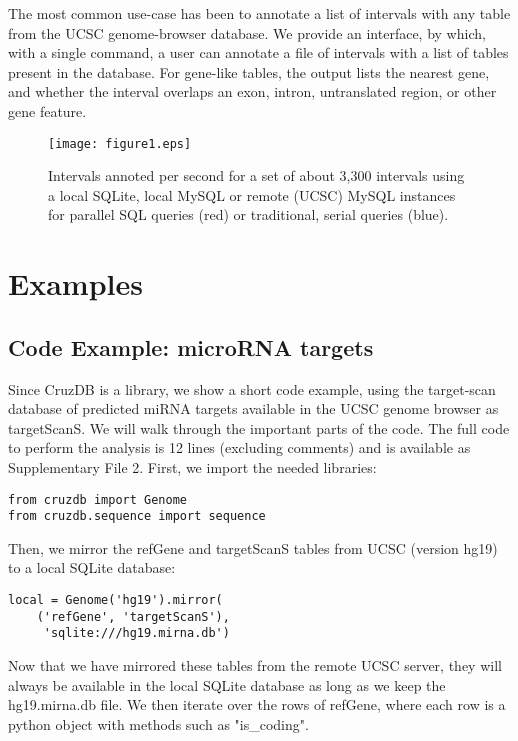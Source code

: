 \documentclass{bioinfo}
\begin{document}
\begin{methods}
The most common use-case has been to annotate a list of intervals with any table from the UCSC genome-browser database. We provide an interface, by which, with a single command, a user can annotate a file of intervals with a list of tables present in the database. For gene-like tables, the output lists the nearest gene, and whether the interval overlaps an exon, intron, untranslated region, or other gene feature.
\end{methods}

\begin{figure}[!tpb]%
\centerline{\texttt{[image: figure1.eps]}}
\caption{Intervals annoted per second for a set of about 3,300 intervals using a local SQLite,
local MySQL or remote (UCSC) MySQL instances for parallel SQL queries (red) or traditional, 
serial queries (blue).
}\label{fig:01}
\end{figure}

\section{Examples}


\subsection{Code Example: microRNA targets}

Since CruzDB is a library, we show a short code example, using the target-scan database of predicted miRNA targets \citep{Grimson} available in the UCSC genome browser as targetScanS. We will walk through the important parts of the code. The full code to perform the analysis is 12 lines (excluding comments) and is available as Supplementary File 2. First, we import the needed libraries:

\begin{verbatim}
from cruzdb import Genome
from cruzdb.sequence import sequence
\end{verbatim}

Then, we mirror the refGene and targetScanS tables from UCSC (version hg19) to a local SQLite database:

\begin{verbatim}
local = Genome('hg19').mirror(
    ('refGene', 'targetScanS'), 
     'sqlite:///hg19.mirna.db')
\end{verbatim}

Now that we have mirrored these tables from the remote UCSC server, they will always be available in the local SQLite database as long as we keep the hg19.mirna.db file. We then iterate over the rows of refGene, where each row is a python object with methods such as "is\_coding".
\end{document}
